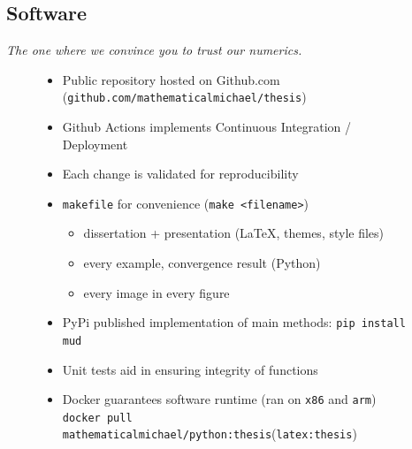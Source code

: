 \subsection{Software}

\begin{frame}[t]{\it The one where we convince you to trust our numerics.}
\centering
\begin{figure}
\begin{itemize}
	\item Public repository hosted on Github.com ({\tt github.com/mathematicalmichael/thesis})
	\item Github Actions implements Continuous Integration / Deployment
	\item Each change is validated for reproducibility
	\item {\tt makefile} for convenience ({\tt make <filename>})
	\begin{itemize}
		\item dissertation + presentation (\LaTeX, themes, style files)
		\item every example, convergence result (Python)
		\item every image in every figure
	\end{itemize}
	\item PyPi published implementation of main methods: {\tt pip install mud}
	\item Unit tests aid in ensuring integrity of functions
	\item Docker guarantees software runtime (ran on {\tt x86} and {\tt arm}) \\ {\tt docker pull mathematicalmichael/python:thesis}({\tt latex:thesis})
\end{itemize}

\end{figure}

\end{frame}
